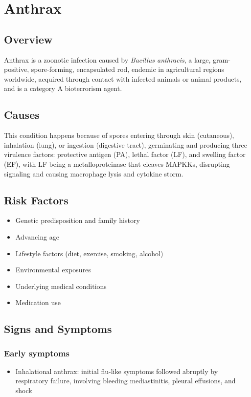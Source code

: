 \chapter{Anthrax}
\label{sec:Anthrax}

\section{Overview}
Anthrax is a zoonotic infection caused by \textit{Bacillus anthracis}, a large, gram-positive, spore-forming, encapsulated rod, endemic in agricultural regions worldwide, acquired through contact with infected animals or animal products, and is a category A bioterrorism agent.
\section{Causes}
This condition happens because of spores entering through skin (cutaneous), inhalation (lung), or ingestion (digestive tract), germinating and producing three virulence factors: protective antigen (PA), lethal factor (LF), and swelling factor (EF), with LF being a metalloproteinase that cleaves MAPKKs, disrupting signaling and causing macrophage lysis and cytokine storm.     
\section{Risk Factors}

\begin{itemize}[noitemsep]
  \item Genetic predisposition and family history
  \item Advancing age
  \item Lifestyle factors (diet, exercise, smoking, alcohol)
  \item Environmental exposures
  \item Underlying medical conditions
  \item Medication use
\end{itemize}
\section{Signs and Symptoms}

\subsection{Early symptoms}
\begin{itemize}[noitemsep]
  \item Inhalational anthrax: initial flu-like symptoms followed abruptly by respiratory failure, involving bleeding mediastinitis, pleural effusions, and shock
\end{itemize}

